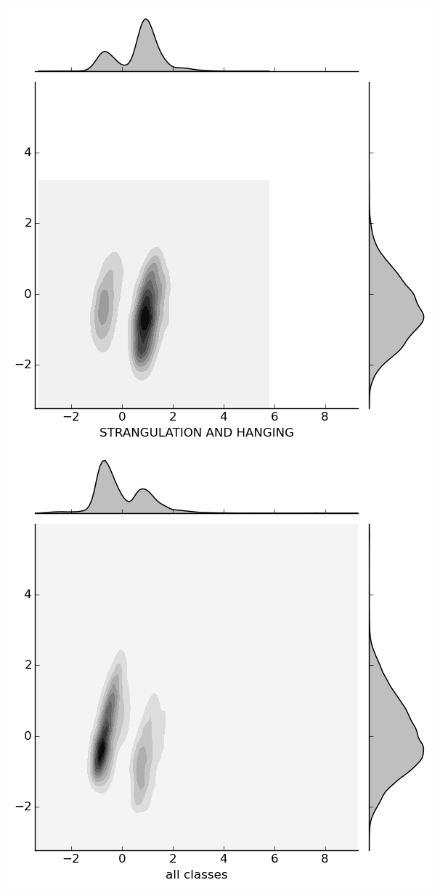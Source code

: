 \documentclass{evanarticle}
\begin{document}
\begin{figure}[H]
  \begin{minipage}[b]{0.20\linewidth}
    \includegraphics[width=\linewidth]{images/weapon/STRANGULATION.png}
  \end{minipage}
  \quad
  \begin{minipage}[b]{0.20\linewidth}
    \includegraphics[width=\linewidth]{images/weapon/all.png}
  \end{minipage}


\end{figure}
\end{document}
